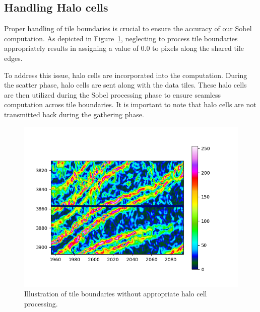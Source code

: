 \subsection{Handling Halo cells}
\label{subsec:handling-halo-cells}

Proper handling of tile boundaries is crucial to ensure the accuracy of our Sobel computation. As depicted in Figure~\ref{fig:tile-boundary}, neglecting to process tile boundaries appropriately results in assigning a value of 0.0 to pixels along the shared tile edges. 

To address this issue, halo cells are incorporated into the computation. During the scatter phase, halo cells are sent along with the data tiles. These halo cells are then utilized during the Sobel processing phase to ensure seamless computation across tile boundaries. It is important to note that halo cells are not transmitted back during the gathering phase.

\begin{figure}[h!]
    \centering
    \includegraphics[width=\linewidth]{images/tile-boundary.png}
    \caption{Illustration of tile boundaries without appropriate halo cell processing.}
    \label{fig:tile-boundary}
\end{figure}